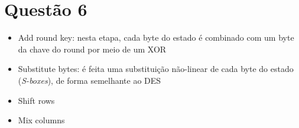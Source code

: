 \documentclass{article}
\begin{document}
\section*{Questão 6}

\begin{itemize}
    \item Add round key: nesta etapa, cada byte do estado é combinado com um byte da chave do round por meio de um XOR
    \item Substitute bytes: é feita uma substituição não-linear de cada byte do estado (\textit{S-boxes}), de forma semelhante ao DES
    \item Shift rows
    \item Mix columns
\end{itemize}
\end{document}
